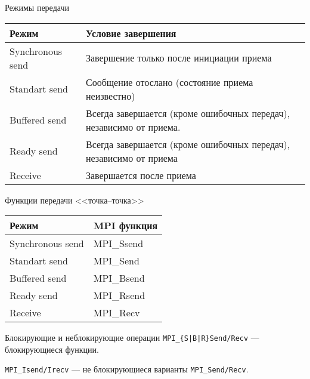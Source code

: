 \begin{frame}{Режимы передачи}
\begin{table}[htpb]
    \begin{center}
    \begin{tabularx}{\textwidth}{|l|X|}
    \hline
    Режим               &   Условие завершения                      \\
    \hline
    \hline
    Synchronous send    &   Завершение только после инициации приема \\
    \hline
    Standart send       &   Сообщение отослано (состояние приема неизвестно)    \\
    \hline
    Buffered send       &   Всегда завершается (кроме ошибочных передач), независимо от приема. \\
    \hline
    Ready send          &   Всегда завершается (кроме ошибочных передач), независимо от приема  \\
    \hline
    Receive             &   Завершается после приема                \\
    \hline
    \end{tabularx}
    \end{center}
\end{table}
\end{frame}

\begin{frame}{Функции передачи <<точка--точка>>}
\begin{table}[htpb]
    \begin{center}
    \begin{tabular}{|l|l|}
    \hline
    Режим               &   MPI функция \\
    \hline
    \hline
    Synchronous send    &   MPI_Ssend   \\
    \hline
    Standart send       &   MPI_Send    \\
    \hline
    Buffered send       &   MPI_Bsend   \\
    \hline
    Ready send          &   MPI_Rsend   \\
    \hline
    Receive             &   MPI_Recv    \\
    \hline
    \end{tabular}
    \end{center}
\end{table}
\end{frame}

\begin{frame}{Блокирующие и неблокирующие операции}
\texttt{MPI_\{S|B|R\}Send/Recv} --- блокирующиеся функции.
\begin{figure}
\centering
{}
\end{figure}
\texttt{MPI_Isend/Irecv} --- не блокирующиеся варианты \texttt{MPI_Send/Recv}.
\end{frame}

